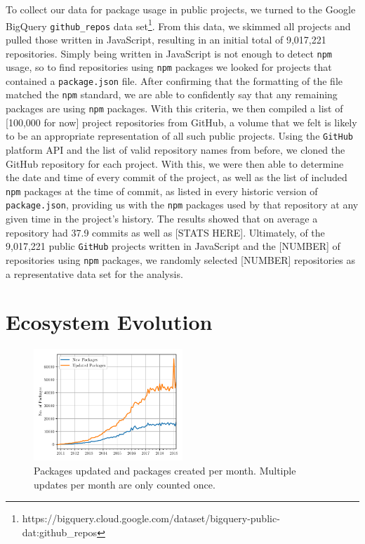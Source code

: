 \documentclass[10pt,conference]{IEEEtran}
\def\code#1{\texttt{#1}}
\begin{document}
  To collect our data for package usage in public projects, 
  we turned to the Google BigQuery \code{github\_repos} data 
  set\footnote{https://bigquery.cloud.google.com/dataset/bigquery-public-dat:github\_repos}.
  From this data, we skimmed all projects and pulled those 
  written in JavaScript, resulting in an initial total of 9,017,221 
  repositories. Simply being written in JavaScript is not enough to detect
  \code{npm} usage, so to find repositories using \code{npm} packages
  we looked for projects that contained a \code{package.json} 
  file. After confirming that the formatting of the file matched the \code{npm}
  standard, we are able to confidently say that any remaining packages are 
  using \code{npm} packages. With this criteria, we then compiled a list 
  of [100,000 for now] project 
  repositories from GitHub, a volume that we felt is likely to be an 
  appropriate representation of all such public projects.
  Using the \code{GitHub} platform API and the list of valid repository names 
  from before, we cloned the GitHub repository for each project. With
  this, we were then able to determine the date and time of every 
  commit of the project, as well as the list of included \code{npm} packages
  at the time of commit, as listed in every historic version of 
  \code{package.json}, providing us with the \code{npm} packages used by that repository
  at any given time in the project's history. The results showed that on average a repository 
  had 37.9 commits as well as [STATS HERE]. Ultimately, of the 9,017,221 
  public \code{GitHub} projects written in JavaScript and the [NUMBER] of repositories
  using \code{npm} packages, we randomly selected [NUMBER] repositories as
  a representative data set for the analysis.


  \section{Ecosystem Evolution}

  \begin{figure}
    \includegraphics[width=0.5\textwidth]{figures/new_vs_updates_by_month.pdf}
    \caption{Packages updated and packages created per month. Multiple updates per month are
    only counted once.}
    \label{npmGrowth}
  \end{figure}
\end{document}
